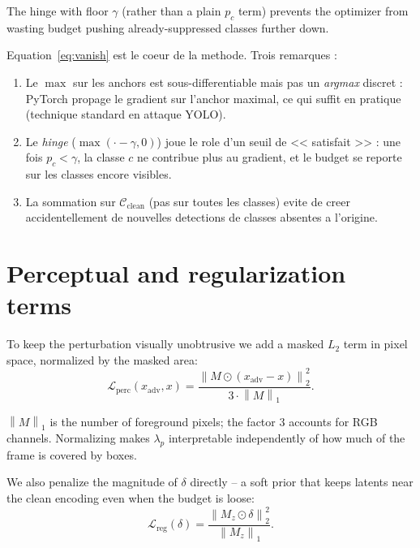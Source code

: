 \documentclass[11pt,a4paper]{article}
\newcommand{\norm}[1]{\left\lVert#1\right\rVert}
\begin{document}
The hinge with floor $\gamma$ (rather than a plain $p_c$ term) prevents the
optimizer from wasting budget pushing already-suppressed classes further down.

\begin{supervisornote}
Equation~\eqref{eq:vanish} est le coeur de la methode. Trois remarques :
\begin{enumerate}[leftmargin=*, itemsep=1pt]
\item Le $\max$ sur les anchors est sous-differentiable mais pas un
\emph{argmax} discret : PyTorch propage le gradient sur l'anchor maximal,
ce qui suffit en pratique (technique standard en attaque YOLO).
\item Le \emph{hinge} ($\max(\cdot - \gamma, 0)$) joue le role d'un seuil
de << satisfait >> : une fois $p_c < \gamma$, la classe $c$ ne contribue
plus au gradient, et le budget se reporte sur les classes encore visibles.
\item La sommation sur $\mathcal{C}_{\text{clean}}$ (pas sur toutes les
classes) evite de creer accidentellement de nouvelles detections de classes
absentes a l'origine.
\end{enumerate}
\end{supervisornote}

\section{Perceptual and regularization terms}\label{sec:perc}

To keep the perturbation visually unobtrusive we add a masked $L_2$ term in
pixel space, normalized by the masked area:
\begin{equation}
\mathcal{L}_{\text{perc}}(x_{\text{adv}}, x)
   = \frac{\norm{M \odot (x_{\text{adv}} - x)}_2^2}{3 \cdot \norm{M}_1}.
\end{equation}

$\norm{M}_1$ is the number of foreground pixels; the factor $3$ accounts for
RGB channels. Normalizing makes $\lambda_p$ interpretable independently of
how much of the frame is covered by boxes.

\noindent We also penalize the magnitude of $\delta$ directly -- a soft prior that
keeps latents near the clean encoding even when the budget is loose:
\begin{equation}
\mathcal{L}_{\text{reg}}(\delta) = \frac{\norm{M_z \odot \delta}_2^2}{\norm{M_z}_1}.
\end{equation}
\end{document}
